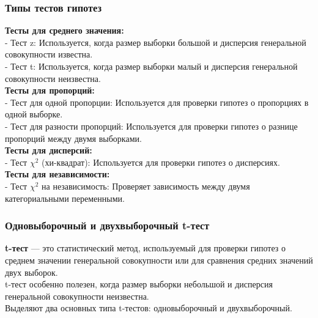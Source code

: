 \documentclass[aspectratio=169]{beamer}
\begin{document}
\begin{frame}
\frametitle{Типы тестов гипотез}
{\bf Тесты для среднего значения:}\\
- Тест z: Используется, когда размер выборки большой и дисперсия генеральной совокупности известна.\\
- Тест t: Используется, когда размер выборки малый и дисперсия генеральной совокупности неизвестна.\\
{\bf Тесты для пропорций:}\\
- Тест для одной пропорции: Используется для проверки гипотез о пропорциях в одной выборке.\\
- Тест для разности пропорций: Используется для проверки гипотез о разнице пропорций между двумя выборками.\\
{\bf Тесты для дисперсий:}\\
- Тест $\chi^2$ (хи-квадрат): Используется для проверки гипотез о дисперсиях.\\
{\bf Тесты для независимости:}\\
- Тест $\chi^2$ на независимость: Проверяет зависимость между двумя категориальными переменными.
\end{frame}

\begin{frame}
\frametitle{Одновыборочный и двухвыборочный t-тест}
{\bf t-тест} — это статистический метод, используемый для проверки гипотез о среднем значении генеральной совокупности или для сравнения средних значений двух выборок.\\
t-тест особенно полезен, когда размер выборки небольшой и дисперсия генеральной совокупности неизвестна.\\
Выделяют два основных типа t-тестов: одновыборочный и двухвыборочный.
\end{frame}
\end{document}
